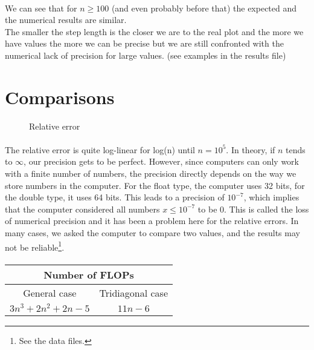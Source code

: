 \documentclass[a4paper, twoside, 11pt]{report}
\theoremstyle{theorem}
\theoremstyle{remark}
\theoremstyle{exemple}
\begin{document}
			
	\paragraph{} We can see that for $n\geq 100$ (and even probably before that) the expected and the numerical results are similar.
\\ The smaller the step length is the closer we are to the real plot and the more we have values the more we can be precise but we are still confronted with the numerical lack of precision for large values. (see examples in the results file)
			
			
			\section{Comparisons}
	
			\begin{figure}[htbp]
					\begin{center}
							
					\end{center}
					\caption{Relative error}
			\end{figure}
			
		\paragraph{} The relative error is quite log-linear for log(n) until $n=10^5$. In theory, if $n$ tends to $\infty$, our precision gets to be perfect. However, since computers can only work with a finite number of numbers, the precision directly depends on the way we store numbers in the computer. For the float type, the computer uses 32 bits, for the double type, it uses 64 bits. This leads to a precision of ${10}^{-7}$, which implies that the computer considered all numbers $x\leq {10}^{-7}$ to be $0$. This is called the loss of numerical precision and it has been a problem here for the relative errors. In many cases, we asked the computer to compare two values, and the results may not be reliable\footnote{See the data files.}.
			
		\paragraph{}
		\begin{center}
		\begin{tabular}{|*{2}{c|}}
  \hline
  \multicolumn{2}{|c|}{Number of FLOPs} \\
	\hline
	General case & Tridiagonal case\\
	\hline	
	$3n^3 + 2n^2 +2n -5$ & $11n-6$ \\
	\hline
\end{tabular}
\end{center}
	
\end{document}
